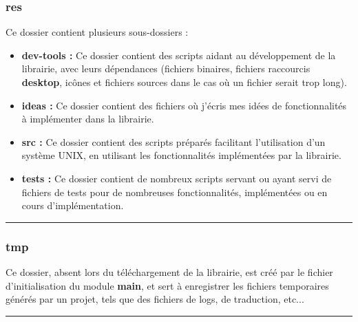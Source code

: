 \documentclass[a4paper,10pt]{article}
\begin{document}
\subsubsection{res}\color{white}
Ce dossier contient plusieurs sous-dossiers :
\begin{itemize}
    \item \textbf{\color{lime}dev-tools\color{white} :} Ce dossier contient des scripts aidant au développement de la librairie, avec leurs dépendances (fichiers binaires, fichiers raccourcis \textbf{desktop}, icônes et fichiers sources dans le cas où un fichier serait trop long).\\[1\baselineskip]

    \item \textbf{\color{lime}ideas\color{white} :} Ce dossier contient des fichiers où j'écris mes idées de fonctionnalités à implémenter dans la librairie.\\[1\baselineskip]

    \item \textbf{\color{lime}src\color{white} :} Ce dossier contient des scripts préparés facilitant l'utilisation d'un système UNIX, en utilisant les fonctionnalités implémentées par la librairie.\\[1\baselineskip]

    \item \textbf{\color{lime}tests\color{white} :} Ce dossier contient de nombreux scripts servant ou ayant servi de fichiers de tests pour de nombreuses fonctionnalités, implémentées ou en cours d'implémentation.\\[1\baselineskip]
\end{itemize}



\color{blue}\par\noindent\rule{\textwidth}{0.4pt}\color{white}

\color{blue}
\subsubsection{tmp}\color{white}
Ce dossier, absent lors du téléchargement de la librairie, est créé par le fichier d'initialisation du module \textbf{main}, et sert à enregistrer les fichiers temporaires générés par un projet, tels que des fichiers de logs, de traduction, etc...\\[1\baselineskip]



\color{red}\par\noindent\rule{\textwidth}{0.4pt}\color{white}
\end{document}
